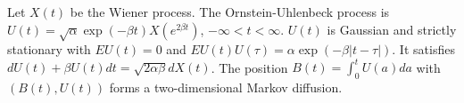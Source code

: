 Let $X(t)$ be the Wiener process. The Ornstein-Uhlenbeck process is $U(t) = \sqrt{\alpha} \exp(-\beta t) X(e^{2\beta t})$, $-\infty < t < \infty$. $U(t)$ is Gaussian and strictly stationary with $EU(t) = 0$ and $E U(t) U(\tau) = \alpha \exp(-\beta |t - \tau|)$. It satisfies $dU(t) + \beta U(t) dt = \sqrt{2\alpha\beta} dX(t)$. The position $B(t) = \int_0^t U(a) da$ with $(B(t), U(t))$ forms a two-dimensional Markov diffusion.

